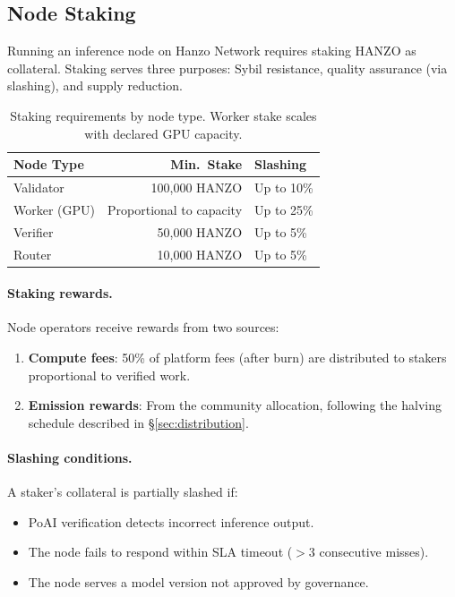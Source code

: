 \subsection{Node Staking}
\label{sec:staking}

Running an inference node on Hanzo Network requires staking HANZO as collateral.
Staking serves three purposes: Sybil resistance, quality assurance (via
slashing), and supply reduction.

\begin{table}[H]
\centering
\small
\begin{tabular}{lrl}
\toprule
\textbf{Node Type} & \textbf{Min.\ Stake} & \textbf{Slashing} \\
\midrule
Validator & 100,000 HANZO & Up to 10\% \\
Worker (GPU) & Proportional to capacity & Up to 25\% \\
Verifier & 50,000 HANZO & Up to 5\% \\
Router & 10,000 HANZO & Up to 5\% \\
\bottomrule
\end{tabular}
\caption{Staking requirements by node type. Worker stake scales with declared GPU capacity.}
\label{tab:staking}
\end{table}

\paragraph{Staking rewards.} Node operators receive rewards from two sources:
\begin{enumerate}[leftmargin=1.4em]
    \item \textbf{Compute fees}: 50\% of platform fees (after burn) are
    distributed to stakers proportional to verified work.
    \item \textbf{Emission rewards}: From the community allocation, following the
    halving schedule described in \S\ref{sec:distribution}.
\end{enumerate}

\paragraph{Slashing conditions.} A staker's collateral is partially slashed if:
\begin{itemize}[leftmargin=1.1em]
    \item PoAI verification detects incorrect inference output.
    \item The node fails to respond within SLA timeout ($>$3 consecutive misses).
    \item The node serves a model version not approved by governance.
\end{itemize}

